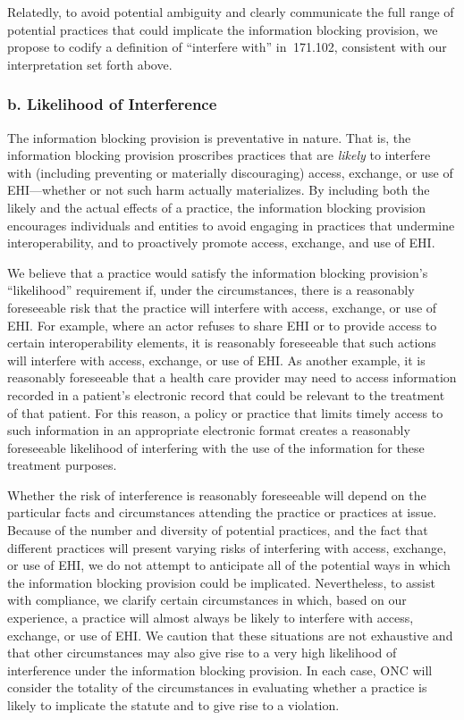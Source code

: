 \documentclass[twoside,11pt]{article}
\begin{document}
          Relatedly, to avoid potential ambiguity and clearly communicate the full range of potential practices that could implicate the information blocking provision, we propose to codify a definition of “interfere with” in \textsection{} 171.102, consistent with our interpretation set forth above.


          \subsubsection{b. Likelihood of Interference}


          The information blocking provision is preventative in nature. That is, the information blocking provision proscribes practices that are \emph{likely} to interfere with (including preventing or materially discouraging) access, exchange, or use of EHI—whether or not such harm actually materializes. By including both the likely and the actual effects of a practice, the information blocking provision encourages individuals and entities to avoid engaging in practices that undermine interoperability, and to proactively promote access, exchange, and use of EHI.


          We believe that a practice would satisfy the information blocking provision's “likelihood” requirement if, under the circumstances, there is a reasonably foreseeable risk that the practice will interfere with access, exchange, or use of EHI. For example, where an actor refuses to share EHI or to provide access to certain interoperability elements, it is reasonably foreseeable that such actions will interfere with access, exchange, or use of EHI. As another example, it is reasonably foreseeable that a health care provider may need to access information recorded in a patient's electronic record that could be relevant to the treatment of that patient. For this reason, a policy or practice that limits timely access to such information in an appropriate electronic format creates a reasonably foreseeable likelihood of interfering with the use of the information for these treatment purposes.


          Whether the risk of interference is reasonably foreseeable will depend on the particular facts and circumstances attending the practice or practices at issue. Because of the number and diversity of potential practices, and the fact that different practices will present varying risks of interfering with access, exchange, or use of EHI, we do not attempt to anticipate all of the potential ways in which the information blocking provision could be implicated. Nevertheless, to assist with compliance, we clarify certain circumstances in which, based on our experience, a practice will almost always be likely to interfere with access, exchange, or use of EHI. We caution that these situations are not exhaustive and that other circumstances may also give rise to a very high likelihood of interference under the information blocking provision. In each case, ONC will consider the totality of the circumstances in evaluating whether a practice is likely to implicate the statute and to give rise to a violation.
\end{document}
